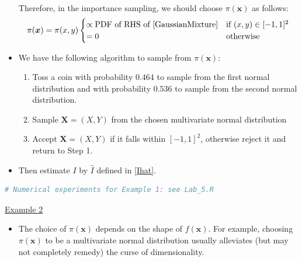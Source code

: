 \documentclass[12pt]{article}
\begin{document}
\begin{itemize}
\begin{align}
	\end{align}
	Therefore, in the importance sampling, we should choose $\pi(\bm{x})$ as follows:
	$$
	\pi(\bm{x}) = \pi(x, y)
	\begin{cases}
	\propto \textrm{PDF of RHS of \eqref{GaussianMixture}} & \textrm{if }(x, y) \in [-1, 1]^2\\
	=0 & \textrm{otherwise}
	\end{cases}
	$$
	\item We have the following algorithm to sample from $\pi(\bm{x})$:
	\begin{enumerate}
		\item Toss a coin with probability $0.464$ to sample from the first normal distribution and with probability $0.536$ to sample from the second normal distribution.
		\item Sample $\bm{X}=(X, Y)$ from the chosen multivariate normal distribution
		\item Accept $\bm{X}=(X, Y)$ if it falls within $[-1, 1]^2$, otherwise reject it and return to Step 1.
	\end{enumerate}
	\item Then estimate $I$ by $\hat{I}$ defined in \eqref{Ihat}.
\end{itemize}
\begin{lstlisting}[style=displaycode, language=R]
# Numerical experiments for Example 1: see Lab_5.R
\end{lstlisting}


\underline{Example 2}

\begin{itemize}
	\item The choice of $\pi(\bm{x})$ depends on the shape of $f(\bm{x})$. For example, choosing $\pi(\bm{x})$ to be a multivariate normal distribution usually alleviates (but may not completely remedy) the curse of dimensionality.
\end{itemize}
\end{document}
